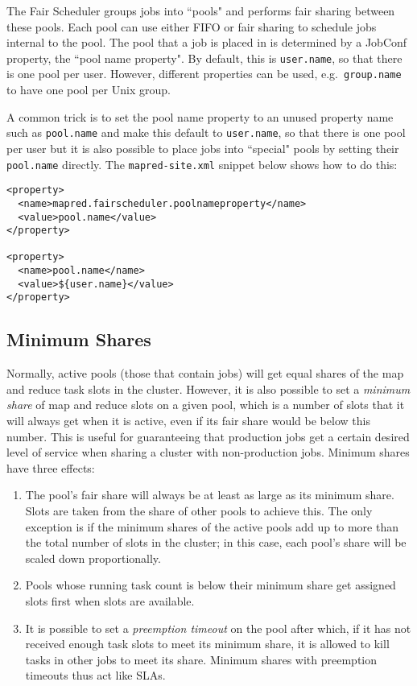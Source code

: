 \documentclass[11pt]{article}
\begin{document}
The Fair Scheduler groups jobs into ``pools" and performs fair sharing between these pools. Each pool can use either FIFO or fair sharing to schedule jobs internal to the pool. The pool that a job is placed in is determined by a JobConf property, the ``pool name property". By default, this is {\tt user.name}, so that there is one pool per user. However, different properties can be used, e.g.~{\tt group.name} to have one pool per Unix group.

A common trick is to set the pool name property to an unused property name such as {\tt pool.name} and make this default to {\tt user.name}, so that there is one pool per user but it is also possible to place jobs into ``special" pools by setting their {\tt pool.name} directly. The {\tt mapred-site.xml} snippet below shows how to do this:

\begin{verbatim}
<property>
  <name>mapred.fairscheduler.poolnameproperty</name>
  <value>pool.name</value>
</property>

<property>
  <name>pool.name</name>
  <value>${user.name}</value>
</property>
\end{verbatim}

\subsection{Minimum Shares}

Normally, active pools (those that contain jobs) will get equal shares of the map and reduce task slots in the cluster. However, it is also possible to set a \emph{minimum share} of map and reduce slots on a given pool, which is a number of slots that it will always get when it is active, even if its fair share would be below this number. This is useful for guaranteeing that production jobs get a certain desired level of service when sharing a cluster with non-production jobs. Minimum shares have three effects:
\begin{enumerate}
  \item The pool's fair share will always be at least as large as its minimum share. Slots are taken from the share of other pools to achieve this. The only exception is if the minimum shares of the active pools add up to more than the total number of slots in the cluster; in this case, each pool's share will be scaled down proportionally.
  \item Pools whose running task count is below their minimum share get assigned slots first when slots are available.
  \item It is possible to set a \emph{preemption timeout} on the pool after which, if it has not received enough task slots to meet its minimum share, it is allowed to kill tasks in other jobs to meet its share. Minimum shares with preemption timeouts thus act like SLAs.
\end{enumerate}
\end{document}
